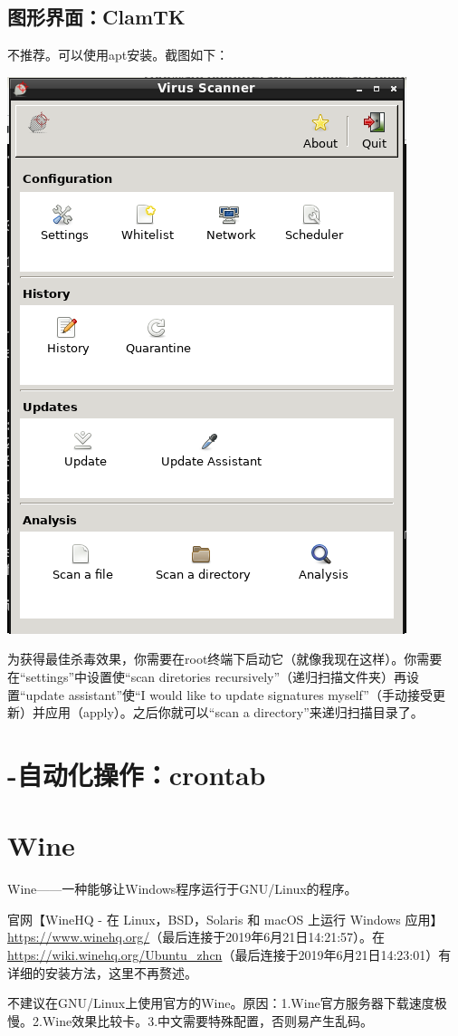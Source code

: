 \section{图形界面：ClamTK}
不推荐。可以使用apt安装。截图如下：
\begin{center}
	\includegraphics[width=0.7\linewidth]{pic/ctk}
\end{center} \par
为获得最佳杀毒效果，你需要在root终端下启动它（就像我现在这样）。你需要在“settings”中设置使“scan diretories recursively”（递归扫描文件夹）再设置“update assistant”使“I would like to update signatures myself”（手动接受更新）并应用（apply）。之后你就可以“scan a directory”来递归扫描目录了。
\chapter{-自动化操作：crontab}
\chapter{Wine}
Wine——一种能够让Windows程序运行于GNU/Linux的程序。\par
官网【WineHQ - 在 Linux，BSD，Solaris 和 macOS 上运行 Windows 应用】\url{https://www.winehq.org/}（最后连接于2019年6月21日14:21:57）。在\url{https://wiki.winehq.org/Ubuntu_zhcn}（最后连接于2019年6月21日14:23:01）有详细的安装方法，这里不再赘述。\par
不建议在GNU/Linux上使用官方的Wine。原因：1.Wine官方服务器下载速度极慢。2.Wine效果比较卡。3.中文需要特殊配置，否则易产生乱码。
